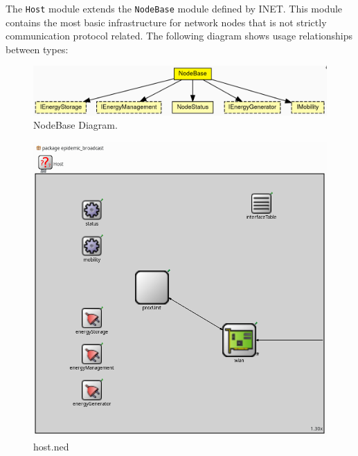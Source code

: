The \texttt{Host} module extends the \texttt{NodeBase} module defined by INET. This
module contains the most basic infrastructure for network nodes that is not
strictly communication protocol related. The following diagram shows usage
relationships between types:
\begin{figure}[H]
    \begin{center}
        \includegraphics[scale=0.26]{img/nodebase.png}
        \caption{NodeBase Diagram.}
        \label{fig:nodebaseOmnet}
    \end{center}
    \vspace*{-0.8cm}
\end{figure}
\begin{figure}[H]
    \begin{center}
        \includegraphics[scale=0.35]{img/host.png}
        \caption{host.ned}
        \label{fig:hostOmnet}
    \end{center}
    \vspace*{-0.8cm}
\end{figure}

